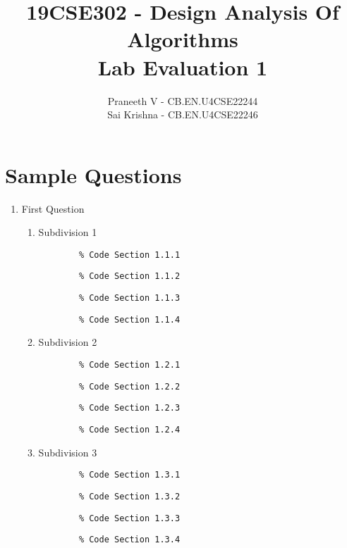 \documentclass{article}
\title{19CSE302 - Design Analysis Of Algorithms \\ Lab Evaluation 1}
\author{Praneeth V - CB.EN.U4CSE22244 \\ Sai Krishna - CB.EN.U4CSE22246}
\begin{document}
\maketitle

\section*{Sample Questions}

\begin{enumerate}
    \item First Question
    \begin{enumerate}[label*=\arabic*.]
        \item Subdivision 1
        \begin{verbatim}
        % Code Section 1.1.1
        \end{verbatim}
        \begin{verbatim}
        % Code Section 1.1.2
        \end{verbatim}
        \begin{verbatim}
        % Code Section 1.1.3
        \end{verbatim}
        \begin{verbatim}
        % Code Section 1.1.4
        \end{verbatim}
        
        \item Subdivision 2
        \begin{verbatim}
        % Code Section 1.2.1
        \end{verbatim}
        \begin{verbatim}
        % Code Section 1.2.2
        \end{verbatim}
        \begin{verbatim}
        % Code Section 1.2.3
        \end{verbatim}
        \begin{verbatim}
        % Code Section 1.2.4
        \end{verbatim}

        \item Subdivision 3
        \begin{verbatim}
        % Code Section 1.3.1
        \end{verbatim}
        \begin{verbatim}
        % Code Section 1.3.2
        \end{verbatim}
        \begin{verbatim}
        % Code Section 1.3.3
        \end{verbatim}
        \begin{verbatim}
        % Code Section 1.3.4
        \end{verbatim}


\end{enumerate}
\end{enumerate}
\end{document}
